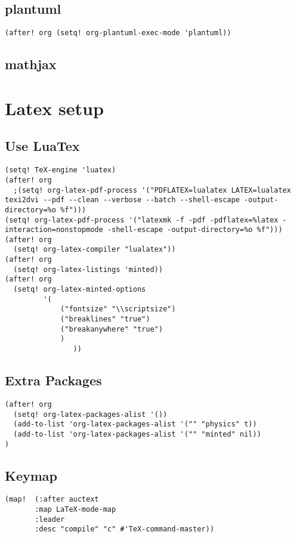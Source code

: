 \documentclass{assignments}
\begin{document}
\subsection*{plantuml}
\label{sec:org8d808a5}
\begin{verbatim}
(after! org (setq! org-plantuml-exec-mode 'plantuml))
\end{verbatim}
\subsection*{mathjax}
\label{sec:orgc11af64}

\section*{Latex setup}
\label{sec:org1d3576d}
\subsection*{Use LuaTex}
\label{sec:org9f7b2b2}
\begin{verbatim}
(setq! TeX-engine 'luatex)
(after! org
  ;(setq! org-latex-pdf-process '("PDFLATEX=lualatex LATEX=lualatex texi2dvi --pdf --clean --verbose --batch --shell-escape -output-directory=%o %f")))
(setq! org-latex-pdf-process '("latexmk -f -pdf -pdflatex=%latex -interaction=nonstopmode -shell-escape -output-directory=%o %f")))
(after! org
  (setq! org-latex-compiler "lualatex"))
(after! org
  (setq! org-latex-listings 'minted))
(after! org
  (setq! org-latex-minted-options
         '(
             ("fontsize" "\\scriptsize")
             ("breaklines" "true")
             ("breakanywhere" "true")
             )
                ))
\end{verbatim}
\subsection*{Extra Packages}
\label{sec:orga3ce401}
\begin{verbatim}
(after! org
  (setq! org-latex-packages-alist '())
  (add-to-list 'org-latex-packages-alist '("" "physics" t))
  (add-to-list 'org-latex-packages-alist '("" "minted" nil))
)
\end{verbatim}

\subsection*{Keymap}
\label{sec:org3f20059}
\begin{verbatim}
(map!  (:after auctext
       :map LaTeX-mode-map
       :leader
       :desc "compile" "c" #'TeX-command-master))
\end{verbatim}
\end{document}
